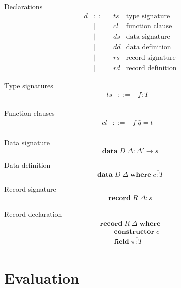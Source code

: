 \documentclass[acmlarge]{acmart}\settopmatter{}
\renewcommand{\|}{\mid}
\begin{document}
Declarations
\[
\begin{array}{lrll}
d  & ::=  & \mathit{ts} & \mbox{type signature}
\\ & \mid & \mathit{cl} & \mbox{function clause}
\\ & \mid & \mathit{ds} & \mbox{data signature}
\\ & \mid & \mathit{dd} & \mbox{data definition}
\\ & \mid & \mathit{rs} & \mbox{record signature}
\\ & \mid & \mathit{rd} & \mbox{record definition}

\end{array}
 \]

Type signatures
\[\begin{array}{lrll}
ts &::=& f : T &\\
\end{array} \]

Function clauses
\[\begin{array}{lrll}
cl &::=& f\; \bar{q} = t &\\
\end{array} \]

Data signature
\[
\textbf{data}\; D\; \Delta : \Delta' \rightarrow s
\]

Data definition
\[
\textbf{data}\; D\; \Delta \;\textbf{where}\; \overline{c : T}
\]

Record signature
\[ \begin{array}{l}
\textbf{record}\; R\; \Delta : s
\end{array}\]

Record declaration
\[ \begin{array}{l}
\textbf{record}\; R\; \Delta \; \textbf{where} \\
\qquad  \textbf{constructor}\; c \\
\qquad  \textbf{field}\; \overline{\pi : T} \\
\end{array}\]




\section{Evaluation}
\label{sec:evaluation}

\newcommand{\datasig}{\text{data } D\; \Delta : \Delta' \to s \text{ where } \overline{c : T}}
\newcommand{\recsig}{\text{record } R\;\Delta : s \text{ where
    $c : T$; } \text{projections } \overline{\pi : T} }
\newcommand{\funsig}{\text{function } f : T \text{ where } \overline{cl}}
\end{document}
